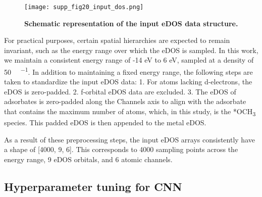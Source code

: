 \begin{figure}[htbp]
  \centering
  \texttt{[image: supp\_fig20\_input\_dos.png]}
  \caption{\textbf{Schematic representation of the input eDOS data structure.}}
  \label{supp_fig20:input_dos}
\end{figure}

For practical purposes, certain spatial hierarchies are expected to remain invariant,
such as the energy range over which the eDOS is sampled.
In this work, we maintain a consistent energy range of -14 eV to 6 eV,
sampled at a density of 50 \si{ \cdot {}^{-1}}.
In addition to maintaining a fixed energy range,
the following steps are taken to standardize the input eDOS data:
  1.	For atoms lacking d-electrons, the eDOS is zero-padded.
  2.	f-orbital eDOS data are excluded.
  3.	The eDOS of adsorbates is zero-padded along the Channels axis to align with the adsorbate that contains the maximum number of atoms, which, in this study, is the *OCH\textsubscript{3} species. This padded eDOS is then appended to the metal eDOS.

As a result of these preprocessing steps, the input eDOS arrays consistently have a shape of [4000, 9, 6].
This corresponds to 4000 sampling points across the energy range, 9 eDOS orbitals, and 6 atomic channels.

\subsection{Hyperparameter tuning for CNN}
\label{supp_sec3.4_hyperparam}

